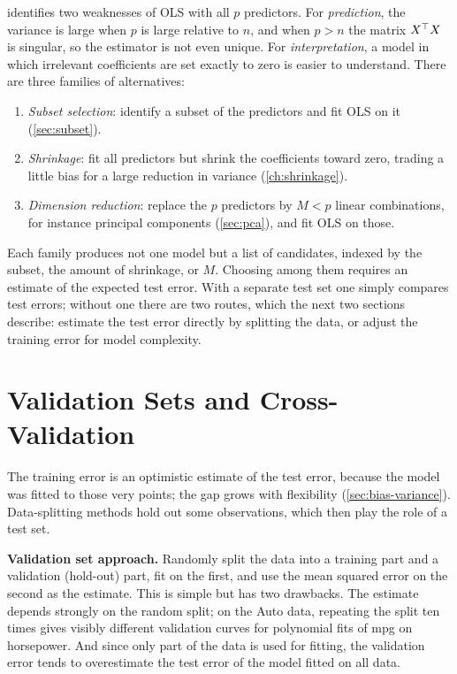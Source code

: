  identifies two weaknesses of OLS with all $p$ predictors. For \emph{prediction}, the variance is large when $p$ is large relative to $n$, and when $p>n$ the matrix $X^{\top} X$ is singular, so the estimator is not even unique. For \emph{interpretation}, a model in which irrelevant coefficients are set exactly to zero is easier to understand. There are three families of alternatives:
\begin{enumerate}[(1)]
  \item \emph{Subset selection}: identify a subset of the predictors and fit OLS on it (\cref{sec:subset}).
  \item \emph{Shrinkage}: fit all predictors but shrink the coefficients toward zero, trading a little bias for a large reduction in variance (\cref{ch:shrinkage}).
  \item \emph{Dimension reduction}: replace the $p$ predictors by $M<p$ linear combinations, for instance principal components (\cref{sec:pca}), and fit OLS on those.
\end{enumerate}
Each family produces not one model but a list of candidates, indexed by the subset, the amount of shrinkage, or $M$. Choosing among them requires an estimate of the expected test error. With a separate test set one simply compares test errors; without one there are two routes, which the next two sections describe: estimate the test error directly by splitting the data, or adjust the training error for model complexity.

\section{Validation Sets and Cross-Validation}\label{sec:cv}

The training error is an optimistic estimate of the test error, because the model was fitted to those very points; the gap grows with flexibility (\cref{sec:bias-variance}). Data-splitting methods hold out some observations, which then play the role of a test set.

\smallskip\noindent\textbf{Validation set approach.} Randomly split the data into a training part and a validation (hold-out) part, fit on the first, and use the mean squared error on the second as the estimate. This is simple but has two drawbacks. The estimate depends strongly on the random split; on the Auto data, repeating the split ten times gives visibly different validation curves for polynomial fits of mpg on horsepower. And since only part of the data is used for fitting, the validation error tends to overestimate the test error of the model fitted on all data.

